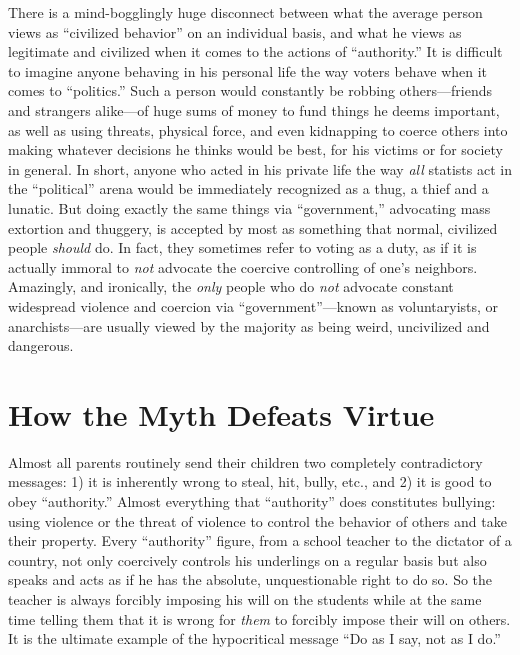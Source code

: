\documentclass{book}
\begin{document}
There is a mind-bogglingly huge disconnect between what the average person views as \enquote{civilized behavior} on an individual basis, and what he views as legitimate and civilized when it comes to the actions of \enquote{authority.} It is difficult to imagine anyone behaving in his personal life the way voters behave when it comes to \enquote{politics.} Such a person would constantly be robbing others---friends and strangers alike---of huge sums of money to fund things he deems important, as well as using threats, physical force, and even kidnapping to coerce others into making whatever decisions he thinks would be best, for his victims or for society in general. In short, anyone who acted in his private life the way \emph{all} statists act in the \enquote{political} arena would be immediately recognized as a thug, a thief and a lunatic. But doing exactly the same things via \enquote{government,} advocating mass extortion and thuggery, is accepted by most as something that normal, civilized people \emph{should} do. In fact, they sometimes refer to voting as a duty, as if it is actually immoral to \emph{not} advocate the coercive controlling of one's neighbors. Amazingly, and ironically, the \emph{only} people who do \emph{not} advocate constant widespread violence and coercion via \enquote{government}---known as voluntaryists, or anarchists---are usually viewed by the majority as being weird, uncivilized and dangerous.

\section{How the Myth Defeats Virtue}

Almost all parents routinely send their children two completely contradictory messages: 1) it is inherently wrong to steal, hit, bully, etc., and 2) it is good to obey \enquote{authority.} Almost everything that \enquote{authority} does constitutes bullying: using violence or the threat of violence to control the behavior of others and take their property. Every \enquote{authority} figure, from a school teacher to the dictator of a country, not only coercively controls his underlings on a regular basis but also speaks and acts as if he has the absolute, unquestionable right to do so. So the teacher is always forcibly imposing his will on the students while at the same time telling them that it is wrong for \emph{them} to forcibly impose their will on others. It is the ultimate example of the hypocritical message \enquote{Do as I say, not as I do.}
\end{document}
